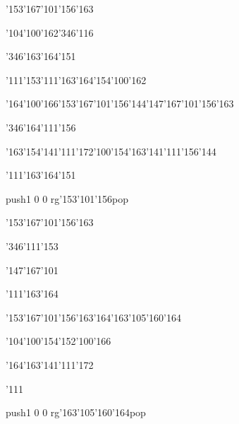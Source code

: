 \null\vfill\ipa\centerline{\enskip\enskip\enskip\enskip\enskip\enskip\enskip\enskip\char'153\char'167\char'101\char'156\char'163}\medskip\centerline{\enskip\enskip\enskip\char'104\char'100\char'162\enskip\enskip\enskip\enskip\enskip\enskip\char'346\char'116}\medskip\centerline{\enskip\char'346\enskip\char'163\char'164\char'151\enskip\enskip\enskip\enskip\enskip\enskip}\medskip\centerline{\enskip\char'111\char'153\enskip\char'111\char'163\char'164\enskip\enskip\enskip\enskip\char'154\char'100\char'162}\medskip\centerline{\enskip\char'164\char'100\char'166\enskip\char'153\char'167\char'101\char'156\char'144\enskip\char'147\char'167\char'101\char'156\char'163\enskip\enskip\enskip}\medskip\centerline{\enskip\char'346\enskip\enskip\enskip\enskip\enskip\enskip\enskip\enskip\enskip\char'164\char'111\char'156\enskip\enskip\enskip}\medskip\centerline{\enskip\char'163\char'154\char'141\char'111\char'172\enskip\char'100\char'154\enskip\char'163\char'141\char'111\char'156\char'144\enskip\enskip\enskip}\medskip\centerline{\enskip\char'111\enskip\char'163\char'164\char'151\enskip\enskip\enskip\enskip\enskip\enskip}\medskip\centerline{\enskip\enskip\enskip\enskip\enskip\enskip\enskip\pdfcolorstack\match push{1 0 0 rg}\char'153\char'101\char'156\pdfcolorstack\match pop{}\enskip\enskip\enskip\enskip\enskip}\medskip\vfill\footline{\hfil\tt\folio\hfil}\eject
\null\vfill\ipa\centerline{\enskip\enskip\enskip\enskip\enskip\enskip\enskip\enskip\char'153\char'167\char'101\char'156\char'163}\medskip\centerline{\enskip\char'346\enskip\enskip\enskip\enskip\enskip\enskip\enskip\enskip\enskip\enskip\char'111\char'153}\medskip\centerline{\enskip\enskip\enskip\char'147\char'167\char'101\enskip\enskip\enskip\enskip\enskip\enskip}\medskip\centerline{\enskip\enskip\enskip\enskip\char'111\char'163\char'164\enskip\enskip\enskip\enskip\enskip\enskip\enskip}\medskip\centerline{\enskip\enskip\enskip\enskip\enskip\char'153\char'167\char'101\char'156\char'163\enskip\char'164\char'163\char'105\char'160\char'164\enskip\enskip\enskip}\medskip\centerline{\enskip\enskip\enskip\char'104\char'100\char'154\enskip\enskip\enskip\enskip\enskip\char'152\char'100\char'166\enskip\enskip\enskip}\medskip\centerline{\enskip\char'164\char'163\char'141\char'111\char'172\enskip\enskip\enskip\enskip\enskip\enskip\enskip\enskip\enskip\enskip\enskip\enskip}\medskip\centerline{\enskip\char'111\enskip\enskip\enskip\enskip\enskip\enskip\enskip\enskip\enskip\enskip}\medskip\centerline{\enskip\enskip\enskip\enskip\enskip\enskip\enskip\enskip\enskip\enskip\enskip\pdfcolorstack\match push{1 0 0 rg}\char'163\char'105\char'160\char'164\pdfcolorstack\match pop{}}\medskip\vfill\footline{\hfil\tt\folio\hfil}\eject\bye